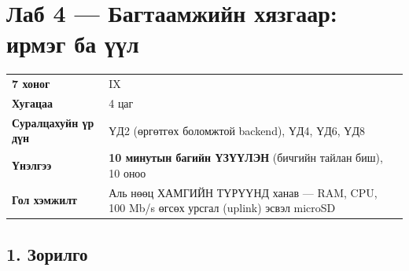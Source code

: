 \chapter{Лаб 4 — Багтаамжийн хязгаар: ирмэг ба үүл}

\begingroup\scriptsize\begin{longtable}[]{@{}ll@{}}
\toprule
\endhead
\begin{minipage}[t]{0.47\columnwidth}\raggedright
\textbf{7 хоног}\strut
\end{minipage} & \begin{minipage}[t]{0.47\columnwidth}\raggedright
IX\strut
\end{minipage}\tabularnewline
\begin{minipage}[t]{0.47\columnwidth}\raggedright
\textbf{Хугацаа}\strut
\end{minipage} & \begin{minipage}[t]{0.47\columnwidth}\raggedright
4 цаг\strut
\end{minipage}\tabularnewline
\begin{minipage}[t]{0.47\columnwidth}\raggedright
\textbf{Суралцахуйн үр дүн}\strut
\end{minipage} & \begin{minipage}[t]{0.47\columnwidth}\raggedright
ҮД2 (өргөтгөх боломжтой backend), ҮД4, ҮД6, ҮД8\strut
\end{minipage}\tabularnewline
\begin{minipage}[t]{0.47\columnwidth}\raggedright
\textbf{Үнэлгээ}\strut
\end{minipage} & \begin{minipage}[t]{0.47\columnwidth}\raggedright
\textbf{10 минутын багийн ҮЗҮҮЛЭН} (бичгийн тайлан биш), 10 оноо\strut
\end{minipage}\tabularnewline
\begin{minipage}[t]{0.47\columnwidth}\raggedright
\textbf{Гол хэмжилт}\strut
\end{minipage} & \begin{minipage}[t]{0.47\columnwidth}\raggedright
Аль нөөц ХАМГИЙН ТҮРҮҮНД ханав --- RAM, CPU, 100 Mb/s өгсөх урсгал (uplink) эсвэл microSD\strut
\end{minipage}\tabularnewline
\bottomrule
\end{longtable}\endgroup

\hypertarget{ux437ux43eux440ux438ux43bux433ux43e}{%
\section{1. Зорилго}\label{ux437ux43eux440ux438ux43bux433ux43e}}

